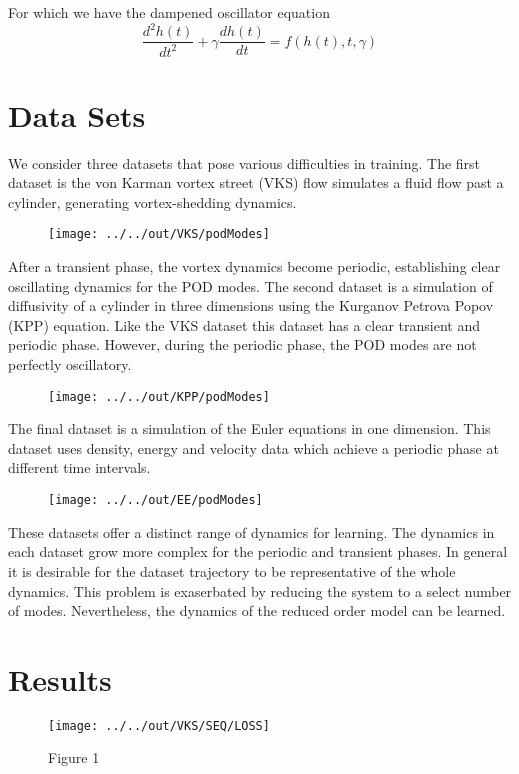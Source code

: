 \documentclass[]{type}
\begin{document}
For which we have the dampened oscillator equation
$$\frac{d^2h(t)}{dt^2}+\gamma\frac{dh(t)}{dt}=f(h(t),t,\gamma)$$

\section{Data Sets}

We consider three datasets that pose various difficulties in training. 
The first dataset is the von Karman vortex street (VKS) flow simulates a fluid flow past a cylinder,
generating vortex-shedding dynamics.
\begin{figure}[H]
	\centering
	\texttt{[image: ../../out/VKS/podModes]}
	\label{fig:f1}
\end{figure}
After a transient phase, the vortex dynamics become periodic,
establishing clear oscillating dynamics for the POD modes.
The second dataset is a simulation of diffusivity of a cylinder in three dimensions
using the Kurganov Petrova Popov (KPP) equation.
Like the VKS dataset this dataset has a clear transient and periodic phase.
However, during the periodic phase, the POD modes are not perfectly oscillatory.
\begin{figure}[H]
	\centering
	\texttt{[image: ../../out/KPP/podModes]}
	\label{fig:f1}
\end{figure}
The final dataset is a simulation of the Euler equations in one dimension.
This dataset uses density, energy and velocity data
which achieve a periodic phase at different time intervals.

\begin{figure}[H]
	\centering
	\texttt{[image: ../../out/EE/podModes]}
	\label{fig:f1}
\end{figure}

These datasets offer a distinct range of dynamics for learning.
The dynamics in each dataset grow more complex for the periodic and transient phases.
In general it is desirable for the dataset trajectory to be representative of the whole dynamics.
This problem is exaserbated by reducing the system to a select number of modes. 
Nevertheless, the dynamics of the reduced order model can be learned.

\section{Results}

\begin{figure}[H]
	\centering
	\texttt{[image: ../../out/VKS/SEQ/LOSS]}
	\caption{Figure 1}
	\label{fig:f1}
\end{figure}
\end{document}
